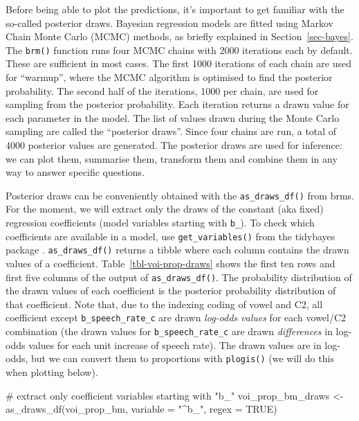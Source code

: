 \documentclass[
  authoryear,
  preprint,
  3p]{elsarticle}
\newenvironment{Shaded}{\begin{snugshade}}{\end{snugshade}}
\newcommand{\AttributeTok}[1]{\textcolor[rgb]{0.40,0.45,0.13}{#1}}
\newcommand{\CommentTok}[1]{\textcolor[rgb]{0.37,0.37,0.37}{#1}}
\newcommand{\ConstantTok}[1]{\textcolor[rgb]{0.56,0.35,0.01}{#1}}
\newcommand{\FunctionTok}[1]{\textcolor[rgb]{0.28,0.35,0.67}{#1}}
\newcommand{\NormalTok}[1]{\textcolor[rgb]{0.00,0.23,0.31}{#1}}
\newcommand{\OtherTok}[1]{\textcolor[rgb]{0.00,0.23,0.31}{#1}}
\newcommand{\StringTok}[1]{\textcolor[rgb]{0.13,0.47,0.30}{#1}}
\begin{document}
Before being able to plot the predictions, it's important to get
familiar with the so-called posterior draws. Bayesian regression models
are fitted using Markov Chain Monte Carlo (MCMC) methods, as briefly
explained in Section~\ref{sec-bayes}. The \texttt{brm()} function runs
four MCMC chains with 2000 iterations each by default. These are
sufficient in most cases. The first 1000 iterations of each chain are
used for ``warmup'', where the MCMC algorithm is optimised to find the
posterior probability. The second half of the iterations, 1000 per
chain, are used for sampling from the posterior probability. Each
iteration returns a drawn value for each parameter in the model. The
list of values drawn during the Monte Carlo sampling are called the
``posterior draws''. Since four chains are run, a total of 4000
posterior values are generated. The posterior draws are used for
inference: we can plot them, summarise them, transform them and combine
them in any way to answer specific questions.

Posterior draws can be conveniently obtained with the
\texttt{as\_draws\_df()} from brms. For the moment, we will extract only
the draws of the constant (aka fixed) regression coefficients (model
variables starting with \texttt{b\_}). To check which coefficients are
available in a model, use \texttt{get\_variables()} from the tidybayes
package \citep{kay2019}. \texttt{as\_draws\_df()} returns a tibble where
each column contains the drawn values of a coefficient.
Table~\ref{tbl-voi-prop-draws} shows the first ten rows and first five
columns of the output of \texttt{as\_draws\_df()}. The probability
distribution of the drawn values of each coefficient is the posterior
probability distribution of that coefficient. Note that, due to the
indexing coding of vowel and C2, all coefficient except
\texttt{b\_speech\_rate\_c} are drawn \emph{log-odds values} for each
vowel/C2 combination (the drawn values for \texttt{b\_speech\_rate\_c}
are drawn \emph{differences} in log-odds values for each unit increase
of speech rate). The drawn values are in log-odds, but we can convert
them to proportions with \texttt{plogis()} (we will do this when
plotting below).

\begin{Shaded}
\begin{Highlighting}[]
\CommentTok{\# extract only coefficient variables starting with "b\_"}
\NormalTok{voi\_prop\_bm\_draws }\OtherTok{\textless{}{-}} \FunctionTok{as\_draws\_df}\NormalTok{(voi\_prop\_bm, }\AttributeTok{variable =} \StringTok{"\^{}b\_"}\NormalTok{, }\AttributeTok{regex =} \ConstantTok{TRUE}\NormalTok{)}
\end{Highlighting}
\end{Shaded}
\end{document}
